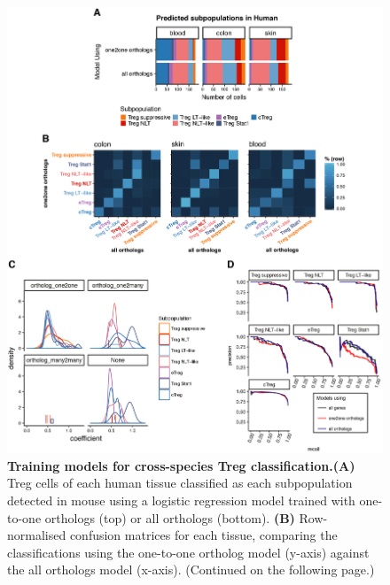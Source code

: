 \begin{figure}[pt] 
\centering    
\includegraphics[width=1.0\textwidth]{Chapter2/Figs/chap2_fig6.png} %
\caption[Examining models for cross-species Treg classification]{\textbf{Training models for cross-species Treg classification.}\newline\textbf{(A)} Treg cells of each human tissue classified as each subpopulation detected in mouse using a logistic regression model trained with one-to-one orthologs (top) or all orthologs (bottom). \textbf{(B)} Row-normalised confusion matrices for each tissue, comparing the classifications using the one-to-one ortholog model (y-axis) against the all orthologs model (x-axis). (Continued on the following page.)}
\label{fig:chap2_fig6}
\end{figure}
\begin{figure}[t]
\end{figure}

